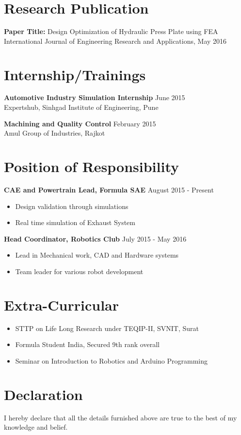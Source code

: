 \documentclass[a4paper,11pt]{article}
\begin{document}
\section{Research Publication}
\textbf{Paper Title:} Design Optimization of Hydraulic Press Plate using FEA \\
International Journal of Engineering Research and Applications, May 2016

\section{Internship/Trainings}
\textbf{Automotive Industry Simulation Internship} \hfill June 2015 \\
Expertshub, Sinhgad Institute of Engineering, Pune

\textbf{Machining and Quality Control} \hfill February 2015 \\
Amul Group of Industries, Rajkot

\section{Position of Responsibility}
\textbf{CAE and Powertrain Lead, Formula SAE} \hfill August 2015 - Present
\begin{itemize}
  \item Design validation through simulations
  \item Real time simulation of Exhaust System
\end{itemize}

\textbf{Head Coordinator, Robotics Club} \hline July 2015 - May 2016
\begin{itemize}
  \item Lead in Mechanical work, CAD and Hardware systems
  \item Team leader for various robot development
\end{itemize}

\section{Extra-Curricular}
\begin{itemize}
  \item STTP on Life Long Research under TEQIP-II, SVNIT, Surat
  \item Formula Student India, Secured 9th rank overall
  \item Seminar on Introduction to Robotics and Arduino Programming
\end{itemize}

\section{Declaration}
I hereby declare that all the details furnished above are true to the best of my knowledge and belief.
\end{document}
